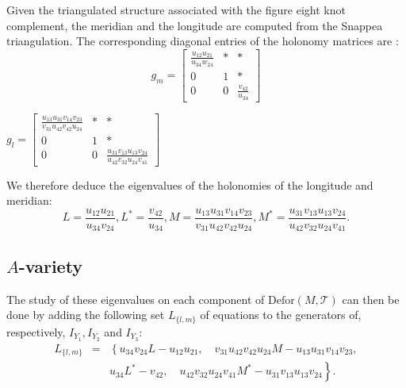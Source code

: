 Given the triangulated structure associated with the figure eight knot
complement, the meridian and the longitude are computed from the Snappea
triangulation. The corresponding diagonal entries of the holonomy matrices are \cite{FKR14}:
\[ g_{m} = \left[ \begin{array}{ccc}
     \frac{u_{12} u_{21}}{u_{34} w_{24}} & \ast & \ast \\
     0 & 1 & \ast \\
     0 & 0 & \frac{v_{42}}{u_{34}}
   \end{array} \right] \]
\begin{center}
  $g_{l} = \left[ \begin{array}{ccc}
    \frac{u_{13} u_{31} v_{14} v_{23}}{v_{31} u_{42} v_{42} u_{24}} & \ast &
    \ast\\
    0 & 1 & \ast\\
    0 & 0 & \frac{u_{31} v_{13} u_{13} v_{24}}{u_{42} v_{32} u_{24} v_{41}}
  \end{array} \right]$
\end{center}
We therefore deduce the eigenvalues of the holonomies of the longitude and
meridian:
\[ L= \frac{u_{12} u_{21}}{u_{34} v_{24}} ,L^{\ast} = \frac{v_{42}}{u_{34}}
   ,M= \frac{u_{13} u_{31} v_{14} v_{23}}{v_{31} u_{42} v_{42} u_{24}}
   ,M^{\ast} = \frac{u_{31} v_{13} u_{13} v_{24}}{u_{42} v_{32} u_{24} v_{41}}
   . \]

\subsection{$A$-variety}

The study of these eigenvalues on each component of $\mathrm{Defor}(M,\mathcal T)$ can then be done by adding the following set $L_{\{l,m\}}$ of equations to the generators of, respectively, $I_{Y_{1}} ,I_{Y_{2}}$ and $I_{Y_{3}}$:
\begin{eqnarray*}
L_{\{ l,m \}} &= &\left\{ u_{34} v_{24} L-u_{12} u_{21}  , \quad v_{31} u_{42} v_{42} u_{24} M-u_{13} u_{31} v_{14} v_{23}  ,\right. \\
&&\left.  u_{34} L^{\ast} -v_{42} 
, \quad u_{42} v_{32}
u_{24} v_{41} M^{\ast} -u_{31} v_{13} u_{13} v_{24} \right\}.
\end{eqnarray*}

